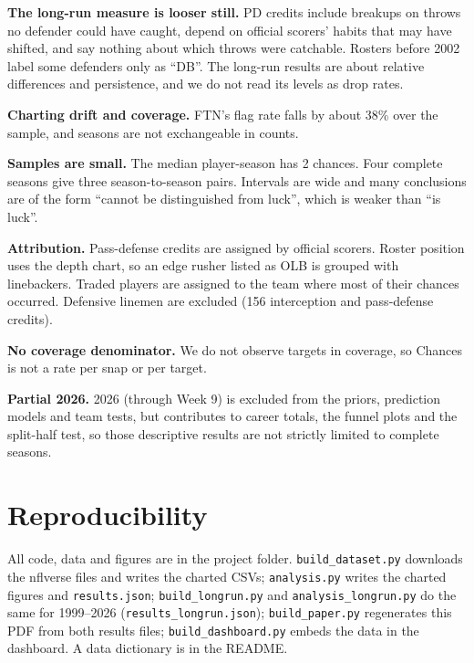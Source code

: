 \documentclass[11pt]{article}
\begin{document}
\textbf{The long-run measure is looser still.} PD credits include breakups on throws no defender could have caught, depend on official scorers' habits that may have shifted, and say nothing about which throws were catchable. Rosters before 2002 label some defenders only as ``DB''. The long-run results are about relative differences and persistence, and we do not read its levels as drop rates.

\textbf{Charting drift and coverage.} FTN's flag rate falls by about 38\% over the sample, and seasons are not exchangeable in counts.

\textbf{Samples are small.} The median player-season has 2 chances. Four complete seasons give three season-to-season pairs. Intervals are wide and many conclusions are of the form ``cannot be distinguished from luck'', which is weaker than ``is luck''.

\textbf{Attribution.} Pass-defense credits are assigned by official scorers. Roster position uses the depth chart, so an edge rusher listed as OLB is grouped with linebackers. Traded players are assigned to the team where most of their chances occurred. Defensive linemen are excluded (156 interception and pass-defense credits).

\textbf{No coverage denominator.} We do not observe targets in coverage, so Chances is not a rate per snap or per target.

\textbf{Partial 2026.} 2026 (through Week 9) is excluded from the priors, prediction models and team tests, but contributes to career totals, the funnel plots and the split-half test, so those descriptive results are not strictly limited to complete seasons.

\section{Reproducibility}
All code, data and figures are in the project folder. \texttt{build\_dataset.py} downloads the nflverse files and writes the charted CSVs; \texttt{analysis.py} writes the charted figures and \texttt{results.json}; \texttt{build\_longrun.py} and \texttt{analysis\_longrun.py} do the same for 1999--2026 (\texttt{results\_longrun.json}); \texttt{build\_paper.py} regenerates this PDF from both results files; \texttt{build\_dashboard.py} embeds the data in the dashboard. A data dictionary is in the README.
\end{document}
